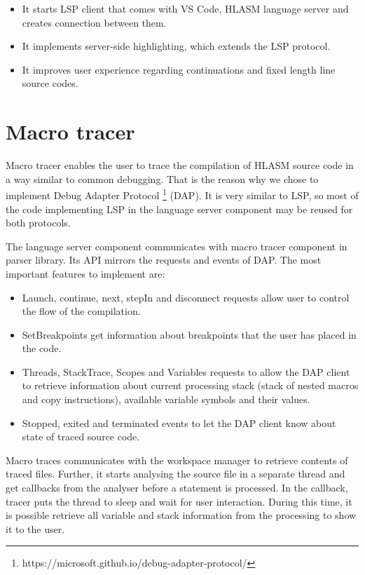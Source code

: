 \begin{itemize}
	\item It starts LSP client that comes with VS Code, HLASM language server and creates connection between them.
	\item It implements server-side highlighting, which extends the LSP protocol.
	\item It improves user experience regarding continuations and fixed length line source codes.
\end{itemize}


\section{Macro tracer}
Macro tracer enables the user to trace the compilation of HLASM source code in a way similar to common debugging. That is the reason why we chose to implement Debug Adapter Protocol \footnote{https://microsoft.github.io/debug-adapter-protocol/} (DAP). It is very similar to LSP, so most of the code implementing LSP in the language server component may be reused for both protocols.

The language server component communicates with macro tracer component in parser library. Its API mirrors the requests and events of DAP. The most important features to implement are:

\begin{itemize}
	\item Launch, continue, next, stepIn and disconnect requests allow user to control the flow of the compilation.
	\item SetBreakpoints get information about breakpoints that the user has placed in the code.
	\item Threads, StackTrace, Scopes and Variables requests to allow the DAP client to retrieve information about current processing stack (stack of nested macros and copy instructions), available variable symbols and their values.
	\item Stopped, exited and terminated events to let the DAP client know about state of traced source code.
\end{itemize}



Macro traces communicates with the workspace manager to retrieve contents of traced files. Further, it starts analysing the source file in a separate thread and get callbacks from the analyser before a statement is processed. In the callback, tracer puts the thread to sleep and wait for user interaction. During this time, it is possible retrieve all variable and stack information from the processing to show it to the user.
